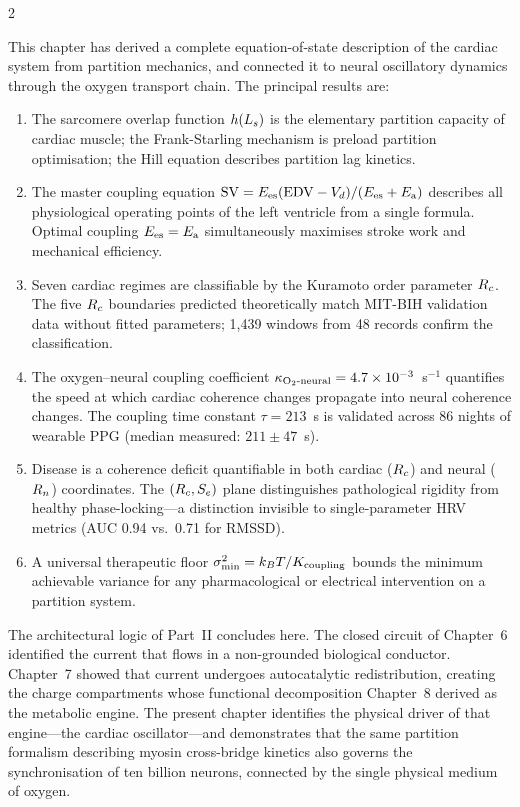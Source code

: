 \begin{multicols}{2}

This chapter has derived a complete equation-of-state description of
the cardiac system from partition mechanics, and connected it to neural
oscillatory dynamics through the oxygen transport chain. The principal
results are:

\begin{enumerate}
\item The sarcomere overlap function $h(L_s)$ is the elementary
  partition capacity of cardiac muscle; the Frank-Starling mechanism
  is preload partition optimisation; the Hill equation describes
  partition lag kinetics.

\item The master coupling equation $\mathrm{SV} = E_{\mathrm{es}}(\mathrm{EDV}-V_d)/(E_{\mathrm{es}}+E_{\mathrm{a}})$
  describes all physiological operating points of the left ventricle
  from a single formula. Optimal coupling $E_{\mathrm{es}} = E_{\mathrm{a}}$ simultaneously
  maximises stroke work and mechanical efficiency.

\item Seven cardiac regimes are classifiable by the Kuramoto order
  parameter $R_c$. The five $R_c$ boundaries predicted theoretically
  match MIT-BIH validation data without fitted parameters; 1{,}439
  windows from 48 records confirm the classification.

\item The oxygen--neural coupling coefficient
  $\kappa_{\mathrm{O_2\text{-}neural}} = 4.7\times10^{-3}$~s$^{-1}$ quantifies the speed at which
  cardiac coherence changes propagate into neural coherence changes.
  The coupling time constant $\tau = 213$~s is validated across
  86 nights of wearable PPG (median measured: $211 \pm 47$~s).

\item Disease is a coherence deficit quantifiable in both cardiac
  ($R_c$) and neural ($R_n$) coordinates. The $(R_c, S_e)$ plane
  distinguishes pathological rigidity from healthy phase-locking---a
  distinction invisible to single-parameter HRV metrics (AUC 0.94
  vs.\ 0.71 for RMSSD).

\item A universal therapeutic floor
  $\sigma^2_{\min} = k_B T/K_{\mathrm{coupling}}$ bounds the minimum
  achievable variance for any pharmacological or electrical
  intervention on a partition system.
\end{enumerate}

\columnbreak

The architectural logic of Part~II concludes here. The closed circuit
of Chapter~6 identified the current that flows in a non-grounded
biological conductor. Chapter~7 showed that current undergoes
autocatalytic redistribution, creating the charge compartments whose
functional decomposition Chapter~8 derived as the metabolic engine.
The present chapter identifies the physical driver of that engine---the
cardiac oscillator---and demonstrates that the same partition
formalism describing myosin cross-bridge kinetics also governs the
synchronisation of ten billion neurons, connected by the single
physical medium of oxygen.


\end{multicols}
